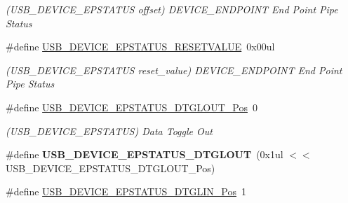 \begin{DoxyCompactItemize}
\begin{DoxyCompactList}\small\item\em (U\+S\+B\+\_\+\+D\+E\+V\+I\+C\+E\+\_\+\+E\+P\+S\+T\+A\+T\+U\+S offset) D\+E\+V\+I\+C\+E\+\_\+\+E\+N\+D\+P\+O\+I\+N\+T End Point Pipe Status \end{DoxyCompactList}\item 
\hypertarget{group___s_a_m_l21___u_s_b_ga0792d8e60e074eb65ec06ce41f142ecf}{}\#define \hyperlink{group___s_a_m_l21___u_s_b_ga0792d8e60e074eb65ec06ce41f142ecf}{U\+S\+B\+\_\+\+D\+E\+V\+I\+C\+E\+\_\+\+E\+P\+S\+T\+A\+T\+U\+S\+\_\+\+R\+E\+S\+E\+T\+V\+A\+L\+U\+E}~0x00ul\label{group___s_a_m_l21___u_s_b_ga0792d8e60e074eb65ec06ce41f142ecf}

\begin{DoxyCompactList}\small\item\em (U\+S\+B\+\_\+\+D\+E\+V\+I\+C\+E\+\_\+\+E\+P\+S\+T\+A\+T\+U\+S reset\+\_\+value) D\+E\+V\+I\+C\+E\+\_\+\+E\+N\+D\+P\+O\+I\+N\+T End Point Pipe Status \end{DoxyCompactList}\item 
\hypertarget{group___s_a_m_l21___u_s_b_gadf49017b5ee61d4ff5ecf15f724e0cb8}{}\#define \hyperlink{group___s_a_m_l21___u_s_b_gadf49017b5ee61d4ff5ecf15f724e0cb8}{U\+S\+B\+\_\+\+D\+E\+V\+I\+C\+E\+\_\+\+E\+P\+S\+T\+A\+T\+U\+S\+\_\+\+D\+T\+G\+L\+O\+U\+T\+\_\+\+Pos}~0\label{group___s_a_m_l21___u_s_b_gadf49017b5ee61d4ff5ecf15f724e0cb8}

\begin{DoxyCompactList}\small\item\em (U\+S\+B\+\_\+\+D\+E\+V\+I\+C\+E\+\_\+\+E\+P\+S\+T\+A\+T\+U\+S) Data Toggle Out \end{DoxyCompactList}\item 
\hypertarget{group___s_a_m_l21___u_s_b_ga1a8f76211c70eeae90065eb5d3207016}{}\#define {\bfseries U\+S\+B\+\_\+\+D\+E\+V\+I\+C\+E\+\_\+\+E\+P\+S\+T\+A\+T\+U\+S\+\_\+\+D\+T\+G\+L\+O\+U\+T}~(0x1ul $<$$<$ U\+S\+B\+\_\+\+D\+E\+V\+I\+C\+E\+\_\+\+E\+P\+S\+T\+A\+T\+U\+S\+\_\+\+D\+T\+G\+L\+O\+U\+T\+\_\+\+Pos)\label{group___s_a_m_l21___u_s_b_ga1a8f76211c70eeae90065eb5d3207016}

\item 
\hypertarget{group___s_a_m_l21___u_s_b_ga2edb8490965d90125035ffb95395ca1d}{}\#define \hyperlink{group___s_a_m_l21___u_s_b_ga2edb8490965d90125035ffb95395ca1d}{U\+S\+B\+\_\+\+D\+E\+V\+I\+C\+E\+\_\+\+E\+P\+S\+T\+A\+T\+U\+S\+\_\+\+D\+T\+G\+L\+I\+N\+\_\+\+Pos}~1\label{group___s_a_m_l21___u_s_b_ga2edb8490965d90125035ffb95395ca1d}


\end{DoxyCompactItemize}
